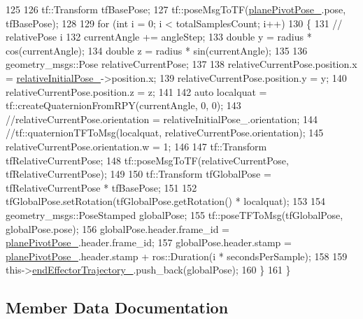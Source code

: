 \begin{DoxyCode}
125 
126         tf::Transform tfBasePose;
127         tf::poseMsgToTF(\hyperlink{classcl__move__group__interface_1_1CbCircularPivotMotion_a0994efbe93b9f9a61fcf3703c360cda2}{planePivotPose\_}.pose, tfBasePose);
128 
129         \textcolor{keywordflow}{for} (\textcolor{keywordtype}{int} i = 0; i < totalSamplesCount; i++)
130         \{
131             \textcolor{comment}{// relativePose i}
132             currentAngle += angleStep;
133             \textcolor{keywordtype}{double} y = radius * cos(currentAngle);
134             \textcolor{keywordtype}{double} z = radius * sin(currentAngle);
135 
136             geometry\_msgs::Pose relativeCurrentPose;
137 
138             relativeCurrentPose.position.x = \hyperlink{classcl__move__group__interface_1_1CbCircularPivotMotion_a1b2cc65d2f27a4dec54c20f1f00d4bb8}{relativeInitialPose\_}->position.x;
139             relativeCurrentPose.position.y = y;
140             relativeCurrentPose.position.z = z;
141 
142             \textcolor{keyword}{auto} localquat = tf::createQuaternionFromRPY(currentAngle, 0, 0);
143             \textcolor{comment}{//relativeCurrentPose.orientation = relativeInitialPose\_.orientation;}
144             \textcolor{comment}{//tf::quaternionTFToMsg(localquat, relativeCurrentPose.orientation);}
145             relativeCurrentPose.orientation.w = 1;
146 
147             tf::Transform tfRelativeCurrentPose;
148             tf::poseMsgToTF(relativeCurrentPose, tfRelativeCurrentPose);
149 
150             tf::Transform tfGlobalPose = tfRelativeCurrentPose * tfBasePose;
151 
152             tfGlobalPose.setRotation(tfGlobalPose.getRotation() * localquat);
153 
154             geometry\_msgs::PoseStamped globalPose;
155             tf::poseTFToMsg(tfGlobalPose, globalPose.pose);
156             globalPose.header.frame\_id = \hyperlink{classcl__move__group__interface_1_1CbCircularPivotMotion_a0994efbe93b9f9a61fcf3703c360cda2}{planePivotPose\_}.header.frame\_id;
157             globalPose.header.stamp = \hyperlink{classcl__move__group__interface_1_1CbCircularPivotMotion_a0994efbe93b9f9a61fcf3703c360cda2}{planePivotPose\_}.header.stamp + ros::Duration(i * 
      secondsPerSample);
158 
159             this->\hyperlink{classcl__move__group__interface_1_1CbMoveEndEffectorTrajectory_ae13dfd31ea3660646e03882f0c2c29f0}{endEffectorTrajectory\_}.push\_back(globalPose);
160         \}
161     \}
\end{DoxyCode}


\subsection{Member Data Documentation}
\mbox{\label{classcl__move__group__interface_1_1CbCircularPivotMotion_a39fa383804d82285e07fa1c5a37cc587}} 
